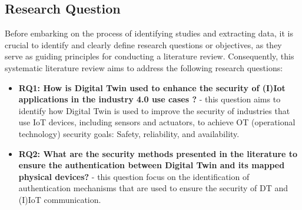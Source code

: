 
\subsection{Research Question}
Before embarking on the process of identifying studies and extracting data, it is crucial to identify and clearly define research questions or objectives, as they serve as guiding principles for conducting a literature review\cite{carrera-rivera_how-conduct_2022}. Consequently, this systematic literature review aims to address the following research questions:

\begin{itemize}

    \item \textbf{RQ1: How is Digital Twin used to enhance the security of (I)Iot applications in the industry 4.0 use cases ?} - 
    this question aims to identify how Digital Twin is used to improve the security of industries that use IoT devices, including sensors and actuators, to achieve OT (operational technology) security goals: Safety, reliability, and availability.

    \item \textbf{RQ2: What are the security methods presented in the literature to ensure the authentication between Digital Twin and its mapped physical devices?} - 
    this question focus on the identification of authentication mechanisms that are used to ensure the security of DT and (I)IoT communication.
\end{itemize}